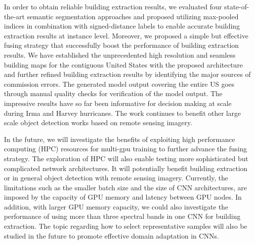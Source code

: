 \documentclass[journal]{IEEEtran}
\begin{document}
In order to obtain reliable building extraction results, we evaluated four state-of-the-art semantic segmentation approaches and proposed utilizing max-pooled indices in combination with signed-distance labels to enable  
accurate building extraction results at instance level. Moreover, we proposed a simple but effective fusing strategy that successfully boost the performance of building extraction results. We have established the unprecedented high resolution and seamless building maps for the contiguous United States with the proposed architecture and further refined building extraction results by identifying the major sources of commission errors. The generated model output covering the entire US goes through manual quality checks for verification of the model output. The impressive results have so far been informative for decision making at scale during Irma and Harvey hurricanes. The work continues to benefit other large scale object detection works based on remote sensing imagery.

In the future, we will investigate the benefits of exploiting high performance computing (HPC) resources for multi-gpu training to further advance the fusing strategy. The exploration of HPC will also enable testing more sophisticated but complicated network architectures. It will potentially benefit building extraction or in general object detection with remote sensing imagery.  Currently, the limitations such as the smaller batch size and the size of CNN architectures, are imposed by the capacity of GPU memory and latency between GPU nodes. In addition, with larger GPU memory capacity, we could also investigate the performance of using more than three spectral bands in one CNN for building extraction.
The topic regarding how to select representative samples will also be studied in the future to promote effective domain adaptation in CNNs.













\ifCLASSOPTIONcaptionsoff
  \newpage
\fi








\end{document}
